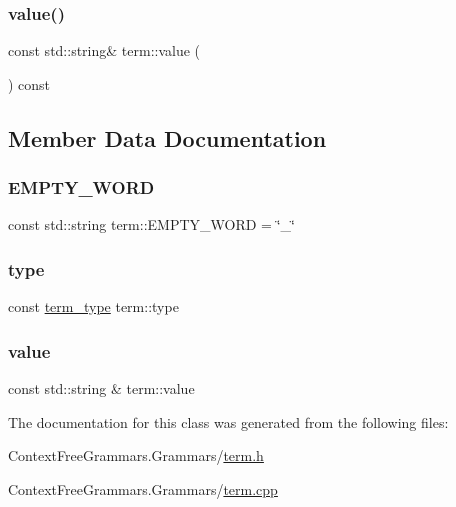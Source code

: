 \mbox{\label{classterm_a05d69d1ab04e91c8a6e4239e522a86d9}} 
\subsubsection{\texorpdfstring{value()}{value()}}
{\footnotesize\ttfamily const std\+::string\& term\+::value (\begin{DoxyParamCaption}{ }\end{DoxyParamCaption}) const}



\subsection{Member Data Documentation}
\mbox{\label{classterm_a1dc39eb1e804273a4609aa4b3344e4b5}} 
\subsubsection{\texorpdfstring{EMPTY\_WORD}{EMPTY\_WORD}}
{\footnotesize\ttfamily const std\+::string term\+::\+E\+M\+P\+T\+Y\+\_\+\+W\+O\+RD = \char`\"{}\+\_\+\char`\"{}\hspace{0.3cm}{\ttfamily [static]}}

\mbox{\label{classterm_a572296f687be8c60d2c31e5c323abbb6}} 
\subsubsection{\texorpdfstring{type}{type}}
{\footnotesize\ttfamily const \mbox{\hyperlink{term_8h_a01c5d13b4b82a95ffc3de77e52c7603b}{term\+\_\+type}} term\+::type}

\mbox{\label{classterm_a1c1e74f49a5ed295dba144950fe779f0}} 
\subsubsection{\texorpdfstring{value}{value}}
{\footnotesize\ttfamily const std\+::string \& term\+::value}



The documentation for this class was generated from the following files\+:\begin{DoxyCompactItemize}
\item 
Context\+Free\+Grammars.\+Grammars/\mbox{\hyperlink{term_8h}{term.\+h}}\item 
Context\+Free\+Grammars.\+Grammars/\mbox{\hyperlink{term_8cpp}{term.\+cpp}}\end{DoxyCompactItemize}
